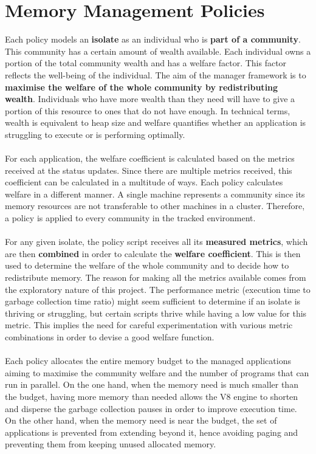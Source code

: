 \documentclass{l4proj}
\begin{document}
\section{Memory Management Policies}
\hspace*{1em} Each policy models an \textbf{isolate} as an individual who is \textbf{part of a community}. This community has a certain amount of wealth available. Each individual owns a portion of the total community wealth and has a welfare factor. This factor reflects the well-being of the individual. The aim of the manager framework is to \textbf{maximise the welfare of the whole community by redistributing wealth}. Individuals who have more wealth than they need will have to give a portion of this resource to ones that do not have enough. In technical terms, wealth is equivalent to heap size and welfare quantifies whether an application is struggling to execute or is performing optimally.
\\\\
\hspace*{1em} For each application, the welfare coefficient is calculated based on the metrics received at the status updates. Since there are multiple metrics received, this coefficient can be calculated in a multitude of ways. Each policy calculates welfare in a different manner. A single machine represents a community since its memory resources are not transferable to other machines in a cluster. Therefore, a policy is applied to every community in the tracked environment.
\\\\
\hspace*{1em} For any given isolate, the policy script receives all its \textbf{measured metrics}, which are then \textbf{combined} in order to calculate the \textbf{welfare coefficient}. This is then used to determine the welfare of the whole community and to decide how to redistribute memory. The reason for making all the metrics available comes from the exploratory nature of this project. The performance metric (execution time to garbage collection time ratio) might seem sufficient to determine if an isolate is thriving or struggling, but certain scripts thrive while having a low value for this metric. This implies the need for careful experimentation with various metric combinations in order to devise a good welfare function.
\\\\
\hspace*{1em} Each policy allocates the entire memory budget to the managed applications aiming to maximise the community welfare and the number of programs that can run in parallel. On the one hand, when the memory need is much smaller than the budget, having more memory than needed allows the V8 engine to shorten and disperse the garbage collection pauses in order to improve execution time. On the other hand, when the memory need is near the budget, the set of applications is prevented from extending beyond it, hence avoiding paging and preventing them from keeping unused allocated memory.
\end{document}
